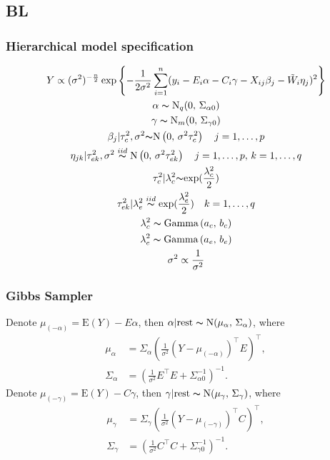 \documentclass[12pt]{article}
\begin{document}
\subsection{BL}
\subsubsection{Hierarchical model specification}

\begin{gather*}
Y \propto (\sigma^{2})^{-\frac{n}{2}} \exp\left\{-\frac{1}{2\sigma^{2}} \sum_{i=1}^{n}(y_{i}- E_{i}\alpha - C_{i}\gamma - X_{ij}\beta_{j} - \tilde{W}_{i}\eta_{j})^{2} \right\} \\ 
\alpha \thicksim \text{N}_{q}(0, \, \Sigma_{\alpha0}) \\
\gamma \thicksim \text{N}_{m}(0, \, \Sigma_{\gamma0}) \\
\beta_{j}| \tau_{c}^{2}, \sigma^{2} {\thicksim} \text{N} \left(0,\, \sigma^{2} \tau_{c}^{2}\right)  \quad j=1,\dots,p\\
\eta_{jk}| \tau_{ek}^{2}, \sigma^{2} \stackrel{iid}{\thicksim} \text{N} \left(0,\, \sigma^{2} \tau_{ek}^{2}\right) \quad j=1,\dots,p,\, k=1,\dots,q \\
\tau_{c}^{2}|\lambda_{c}^{2}{\thicksim} \text{exp} (\frac{\lambda_{c}^{2}}{2})\\
\tau_{ek}^{2}|\lambda_{e}^{2}\stackrel{iid} {\thicksim} \text{exp} (\frac{\lambda_{e}^{2}}{2})\quad k=1,\dots,q\\
\lambda_{c}^2 \thicksim \text{Gamma}\left(a_{c}, \, b_{c}\right) \\
\lambda_{e}^2 \thicksim \text{Gamma}\left(a_{e}, \, b_{e}\right) \\
\sigma^{2} \propto \frac{1}{\sigma^2}
\end{gather*}

\subsubsection{Gibbs Sampler}
Denote $\mu_{(-\alpha)}=\text{E}(Y)-E\alpha$, then $\alpha|\text{rest} \thicksim \text{N}(\mu_{\alpha}, \, \Sigma_{\alpha})$, where
\begin{equation*}
	\begin{aligned}
	\mu_{\alpha} &= \Sigma_{\alpha}(\frac{1}{\sigma^2}(Y-\mu_{(-\alpha)})^\top E)^\top, \\
	\Sigma_{\alpha} &= \left(\frac{1}{\sigma^{2}}E^\top E + \Sigma_{\alpha0}^{-1} \right)^{-1}.
	\end{aligned}
	\end{equation*}
Denote $\mu_{(-\gamma)}=\text{E}(Y)-C\gamma$, then $\gamma|\text{rest} \thicksim \text{N}(\mu_{\gamma}, \, \Sigma_{\gamma})$, where
\begin{equation*}
	\begin{aligned}
	\mu_{\gamma} &= \Sigma_{\gamma}(\frac{1}{\sigma^2}(Y-\mu_{(-\gamma)})^\top C)^\top, \\
	\Sigma_{\gamma} &= \left(\frac{1}{\sigma^{2}}C^\top C + \Sigma_{\gamma0}^{-1} \right)^{-1}. 
	\end{aligned}
	\end{equation*}
\end{document}
